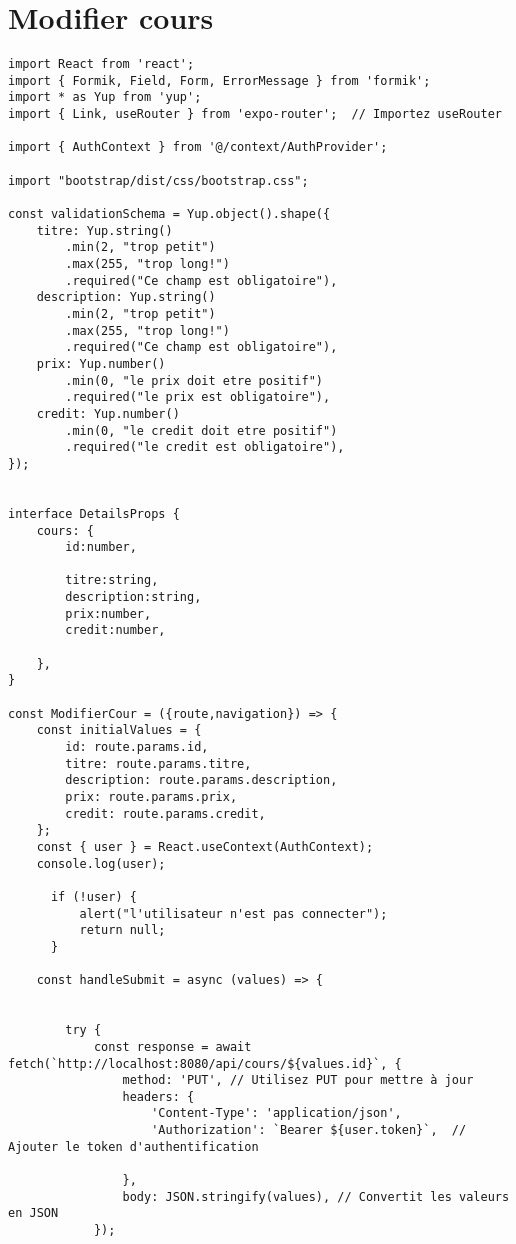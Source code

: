 \documentclass[10pt,a4paper]{article}
\begin{document}
\section{Modifier cours}
\begin{verbatim}
import React from 'react';
import { Formik, Field, Form, ErrorMessage } from 'formik';
import * as Yup from 'yup';
import { Link, useRouter } from 'expo-router';  // Importez useRouter

import { AuthContext } from '@/context/AuthProvider';

import "bootstrap/dist/css/bootstrap.css";

const validationSchema = Yup.object().shape({
    titre: Yup.string()
        .min(2, "trop petit")
        .max(255, "trop long!")
        .required("Ce champ est obligatoire"),
    description: Yup.string()
        .min(2, "trop petit")
        .max(255, "trop long!")
        .required("Ce champ est obligatoire"),
    prix: Yup.number()
        .min(0, "le prix doit etre positif")
        .required("le prix est obligatoire"),
    credit: Yup.number()
        .min(0, "le credit doit etre positif")
        .required("le credit est obligatoire"),
});


interface DetailsProps {
    cours: {
        id:number,

        titre:string,
        description:string,
        prix:number,
        credit:number,
    
    },
}

const ModifierCour = ({route,navigation}) => {
    const initialValues = {
        id: route.params.id,
        titre: route.params.titre,
        description: route.params.description,
        prix: route.params.prix,
        credit: route.params.credit,
    };
    const { user } = React.useContext(AuthContext);
    console.log(user);
    
      if (!user) {
          alert("l'utilisateur n'est pas connecter");
          return null;
      }

    const handleSubmit = async (values) => {
   
        
        try {
            const response = await fetch(`http://localhost:8080/api/cours/${values.id}`, {
                method: 'PUT', // Utilisez PUT pour mettre à jour
                headers: {
                    'Content-Type': 'application/json',
                    'Authorization': `Bearer ${user.token}`,  // Ajouter le token d'authentification

                },
                body: JSON.stringify(values), // Convertit les valeurs en JSON
            });
    

\end{verbatim}
\end{document}
